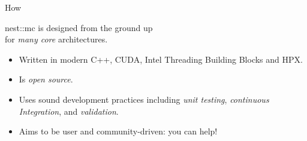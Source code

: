 \documentclass[a0paper,portrait]{baposter}
\newcommand{\nestmc}{{\textcolor{blue!30!black}{nest::mc}}\xspace}
\newcommand{\newemph}[1]{{\color{blue!40!black}\em #1}}
\begin{document}
\begin{poster}
\begin{posterbox}[name=how,column=1,below=motivation,span=1]{How}
    \begin{center}
        \nestmc is designed from the ground up\\for \newemph{many core}  architectures.
    \end{center}
    \vspace{-10pt}
    \begin{itemize}
        \item Written in modern C++, CUDA, Intel Threading Building Blocks and HPX.
        \item Is \newemph{open source}.
        \item Uses sound development practices including \newemph{unit testing}, \newemph{continuous Integration}, and \newemph{validation}.
        \item Aims to be user and community-driven: you can help!
    \end{itemize}
\end{posterbox}


\end{poster}
\end{document}
